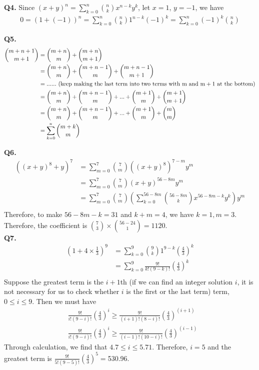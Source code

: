 \documentclass{article}[12pt]
\begin{document}
\noindent \textbf{Q4.}
Since $(x+y)^n=\sum\limits_{k=0}^n\binom{n}{k}x^{n-k}y^k$, let $x=1$, $y=-1$, we have
\begin{align*}
0=(1+(-1))^n=\sum_{k=0}^n\binom{n}{k}1^{n-k}(-1)^k=\sum_{k=0}^n(-1)^k\binom{n}{k}
\end{align*}



\noindent \textbf{Q5.}
\begin{align*}
\binom{m+n+1}{m+1}&=\binom{m+n}{m}+\binom{m+n}{m+1}\\
&=\binom{m+n}{m}+\binom{m+n-1}{m}+\binom{m+n-1}{m+1}\\
&=......\ \rm{(keep\ making\ the\ last\ term\ into\ two\ terms\ with\ m\ and\ m+1\ at\ the\ bottom)}\\
&=\binom{m+n}{m}+\binom{m+n-1}{m}+...+\binom{m+1}{m}+\binom{m+1}{m+1}\\
&=\binom{m+n}{m}+\binom{m+n-1}{m}+...+\binom{m+1}{m}+\binom{m}{m}\\
&=\sum_{k=0}^{n}\binom{m+k}{m}
\end{align*}


\noindent \textbf{Q6.}
\begin{align*}
\left((x+y)^{8}+y\right)^{7}
&=\sum_{m=0}^7\binom{7}{m}((x+y)^8)^{7-m}y^m\\
&=\sum_{m=0}^7\binom{7}{m}(x+y)^{56-8m}y^m\\
&=\sum_{m=0}^7\binom{7}{m}(\sum_{k=0}^{56-8m}\binom{56-8m}{k}x^{56-8m-k}y^k)y^m\\
\end{align*}
Therefore, to make $56-8m-k=31$ and $k+m=4$, we have $k=1,m=3$. Therefore, the coefficient is $\binom{7}{3}\times \binom{56-24}{1}=1120$.\\


\noindent \textbf{Q7.}
\begin{align*}
(1+4\times \frac{1}{3})^{9}&=\sum_{k=0}^{9}\binom{9}{k}1^{9-k}(\frac{4}{3})^k\\
&=\sum_{k=0}^{9}\frac{9!}{k!(9-k)!}(\frac{4}{3})^k\\
\end{align*}
Suppose the greatest term is the $i+1$th (if we can find an integer solution $i$, it is not necessary for us to check whether $i$ is the first or the last term) term, $0\leq i\leq 9$. Then we must have 
\begin{align*}
&\frac{9!}{i!(9-i)!}(\frac{4}{3})^i\geq\frac{9!}{(i+1)!(8-i)!}(\frac{4}{3})^{(i+1)}\\
&\frac{9!}{i!(9-i)!}(\frac{4}{3})^i\geq\frac{9!}{(i-1)!(10-i)!}(\frac{4}{3})^{(i-1)}
\end{align*}
Through calculation, we find that $4.7\leq i\leq 5.71$. Therefore, $i=5$ and the greatest term is $\frac{9!}{5!(9-5)!}(\frac{4}{3})^5=$530.96.\\
\end{document}

